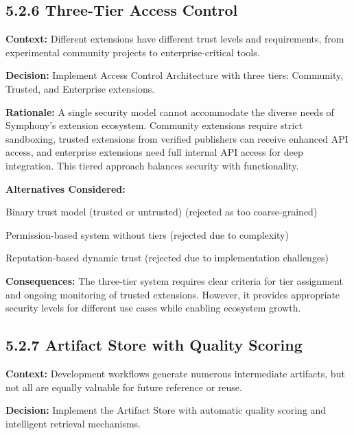 \subsection*{5.2.6 Three-Tier Access Control}

\textbf{Context:} Different extensions have different trust levels and requirements, from experimental community projects to enterprise-critical tools.

\textbf{Decision:} Implement Access Control Architecture with three tiers: Community, Trusted, and Enterprise extensions.

\textbf{Rationale:} A single security model cannot accommodate the diverse needs of Symphony's extension ecosystem. Community extensions require strict sandboxing, trusted extensions from verified publishers can receive enhanced API access, and enterprise extensions need full internal API access for deep integration. This tiered approach balances security with functionality.

\textbf{Alternatives Considered:}
\begin{compactlist}
    \item Binary trust model (trusted or untrusted) (rejected as too coarse-grained)
    \item Permission-based system without tiers (rejected due to complexity)
    \item Reputation-based dynamic trust (rejected due to implementation challenges)
\end{compactlist}

\textbf{Consequences:} The three-tier system requires clear criteria for tier assignment and ongoing monitoring of trusted extensions. However, it provides appropriate security levels for different use cases while enabling ecosystem growth.

\subsection*{5.2.7 Artifact Store with Quality Scoring}

\textbf{Context:} Development workflows generate numerous intermediate artifacts, but not all are equally valuable for future reference or reuse.

\textbf{Decision:} Implement the Artifact Store with automatic quality scoring and intelligent retrieval mechanisms.

